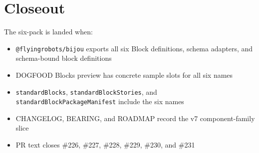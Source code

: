 \section{Closeout}\label{record-094-closeout}

The six-pack is landed when:

\begin{itemize}
\tightlist
\item
  \texttt{@\allowbreak{}f\allowbreak{}l\allowbreak{}y\allowbreak{}i\allowbreak{}n\allowbreak{}g\allowbreak{}r\allowbreak{}o\allowbreak{}b\allowbreak{}o\allowbreak{}t\allowbreak{}s\allowbreak{}/\allowbreak{}b\allowbreak{}i\allowbreak{}j\allowbreak{}o\allowbreak{}u} exports all six Block definitions, schema adapters, and schema-bound block definitions
\item
  DOGFOOD Blocks preview has concrete sample slots for all six names
\item
  \texttt{s\allowbreak{}t\allowbreak{}a\allowbreak{}n\allowbreak{}d\allowbreak{}a\allowbreak{}r\allowbreak{}d\allowbreak{}B\allowbreak{}l\allowbreak{}o\allowbreak{}c\allowbreak{}k\allowbreak{}s}, \texttt{s\allowbreak{}t\allowbreak{}a\allowbreak{}n\allowbreak{}d\allowbreak{}a\allowbreak{}r\allowbreak{}d\allowbreak{}B\allowbreak{}l\allowbreak{}o\allowbreak{}c\allowbreak{}k\allowbreak{}S\allowbreak{}t\allowbreak{}o\allowbreak{}r\allowbreak{}i\allowbreak{}e\allowbreak{}s}, and \texttt{s\allowbreak{}t\allowbreak{}a\allowbreak{}n\allowbreak{}d\allowbreak{}a\allowbreak{}r\allowbreak{}d\allowbreak{}B\allowbreak{}l\allowbreak{}o\allowbreak{}c\allowbreak{}k\allowbreak{}P\allowbreak{}a\allowbreak{}c\allowbreak{}k\allowbreak{}a\allowbreak{}g\allowbreak{}e\allowbreak{}M\allowbreak{}a\allowbreak{}n\allowbreak{}i\allowbreak{}f\allowbreak{}e\allowbreak{}s\allowbreak{}t} include the six names
\item
  CHANGELOG, BEARING, and ROADMAP record the v7 component-family slice
\item
  PR text closes \#226, \#227, \#228, \#229, \#230, and \#231
\end{itemize}

